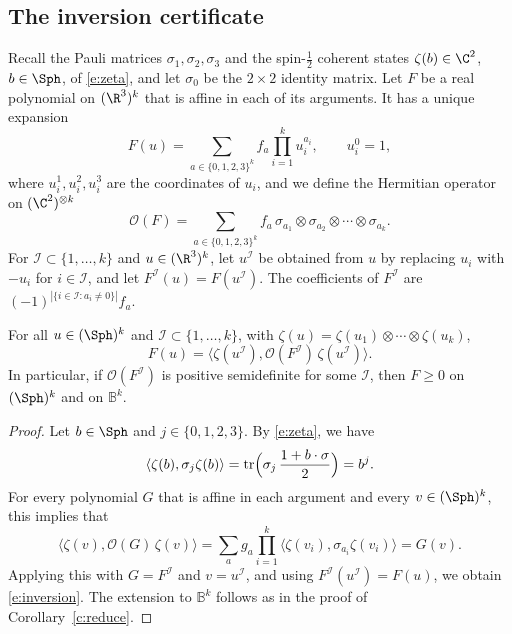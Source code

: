 \subsection{The inversion certificate}\label{s:inversion}

Recall the Pauli matrices $\sigma_1, \sigma_2, \sigma_3$ and the spin-$\frac12$ coherent states $\zeta(b) \in \C^2$, $b \in \Sph$, of \eqref{e:zeta}, and let $\sigma_0$ be the $2 \times 2$ identity matrix. Let $F$ be a real polynomial on $(\R^3)^k$ that is affine in each of its arguments. It has a unique expansion
\begin{equation}\label{e:Fexp}
F(u) = \sum_{a \in \{0, 1, 2, 3\}^k} f_a \prod_{i = 1}^k u_i^{a_i}, \qquad u_i^0 = 1 ,
\end{equation}
where $u_i^1, u_i^2, u_i^3$ are the coordinates of $u_i$, and we define the Hermitian operator on $(\C^2)^{\otimes k}$
\begin{equation}\label{e:OF}
\mathcal O(F) = \sum_{a \in \{0, 1, 2, 3\}^k} f_a \, \sigma_{a_1} \otimes \sigma_{a_2} \otimes \cdots \otimes \sigma_{a_k} .
\end{equation}
For $\mathcal I \subset \{1, \dots, k\}$ and $u \in (\R^3)^k$, let $u^{\mathcal I}$ be obtained from $u$ by replacing $u_i$ with $-u_i$ for $i \in \mathcal I$, and let $F^{\mathcal I}(u) = F(u^{\mathcal I})$. The coefficients of $F^{\mathcal I}$ are $(-1)^{|\{i \in \mathcal I : a_i \neq 0\}|} f_a$.

\begin{lemma}\label{l:inversion}
For all $u \in (\Sph)^k$ and $\mathcal I \subset \{1, \dots, k\}$, with $\zeta(u) = \zeta(u_1) \otimes \cdots \otimes \zeta(u_k)$,
\begin{equation}\label{e:inversion}
F(u) = \bigl\langle \zeta(u^{\mathcal I}), \mathcal O(F^{\mathcal I}) \, \zeta(u^{\mathcal I}) \bigr\rangle .
\end{equation}
In particular, if $\mathcal O(F^{\mathcal I})$ is positive semidefinite for some $\mathcal I$, then $F \ge 0$ on $(\Sph)^k$ and on $\mathbb B^k$.
\end{lemma}

\begin{proof}
Let $b \in \Sph$ and $j \in \{0, 1, 2, 3\}$. By \eqref{e:zeta}, we have
\begin{equation*}
\langle \zeta(b), \sigma_j \zeta(b) \rangle = \operatorname{tr} \Bigl( \sigma_j \, \frac{1 + b \cdot \sigma}{2} \Bigr) = b^j .
\end{equation*}
For every polynomial $G$ that is affine in each argument and every $v \in (\Sph)^k$, this implies that
\begin{equation*}
\langle \zeta(v), \mathcal O(G) \, \zeta(v) \rangle = \sum_a g_a \prod_{i = 1}^k \langle \zeta(v_i), \sigma_{a_i} \zeta(v_i) \rangle = G(v) .
\end{equation*}
Applying this with $G = F^{\mathcal I}$ and $v = u^{\mathcal I}$, and using $F^{\mathcal I}(u^{\mathcal I}) = F(u)$, we obtain \eqref{e:inversion}. The extension to $\mathbb B^k$ follows as in the proof of Corollary~\ref{c:reduce}.
\end{proof}


